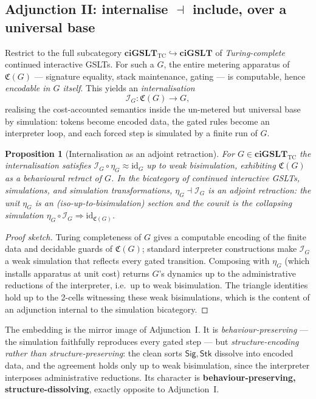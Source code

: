 \documentclass[11pt]{article}
\theoremstyle{definition}
\theoremstyle{plain}
\newtheorem{proposition}[definition]{Proposition}
\newcommand{\ciGSLT}{\mathbf{ciGSLT}}
\newcommand{\ciGSLTtc}{\mathbf{ciGSLT}_{\mathrm{TC}}}
\newcommand{\Imp}{\mathcal{I}}
\newcommand{\id}{\mathrm{id}}
\newcommand{\Sig}{\mathsf{Sig}}
\newcommand{\Tok}{\mathsf{Stk}}
\newcommand{\Cost}{\mathfrak{C}}              %
\begin{document}
\subsection{Adjunction II: internalise \texorpdfstring{$\dashv$}{-|} include, over a universal base}

Restrict to the full subcategory $\ciGSLTtc \hookrightarrow \ciGSLT$ of
\emph{Turing-complete} continued interactive GSLTs. For such a $G$, the
entire metering apparatus of $\Cost(G)$ --- signature equality, stack
maintenance, gating --- is computable, hence \emph{encodable in $G$
itself}. This yields an \emph{internalisation}
\[
  \Imp_G : \Cost(G) \longrightarrow G,
\]
realising the cost-accounted semantics inside the un-metered but
universal base by simulation: tokens become encoded data, the gated rules
become an interpreter loop, and each forced step is simulated by a finite
run of $G$.

\begin{proposition}[Internalisation as an adjoint retraction]
\label{prop:adj2}
For $G \in \ciGSLTtc$ the internalisation satisfies
$\Imp_G \circ \eta_G \approx \id_G$ up to weak bisimulation, exhibiting
$\Cost(G)$ as a behavioural retract of $G$. In the bicategory of
continued interactive GSLTs, simulations, and simulation transformations,
$\eta_G \dashv \Imp_G$ is an adjoint retraction: the unit
$\eta_G$ is an (iso-up-to-bisimulation) section and the counit is the
collapsing simulation $\eta_G \circ \Imp_G \Rightarrow \id_{\Cost(G)}$.
\end{proposition}

\begin{proof}[Proof sketch]
Turing completeness of $G$ gives a computable encoding of the finite data
and decidable guards of $\Cost(G)$; standard interpreter constructions
make $\Imp_G$ a weak simulation that reflects every gated transition.
Composing with $\eta_G$ (which installs apparatus at unit cost) returns
$G$'s dynamics up to the administrative reductions of the interpreter,
i.e.\ up to weak bisimulation. The triangle identities hold up to the
2-cells witnessing these weak bisimulations, which is the content of an
adjunction internal to the simulation bicategory.
\end{proof}

The embedding is the mirror image of Adjunction~I. It is
\emph{behaviour-preserving} --- the simulation faithfully reproduces every
gated step --- but \emph{structure-encoding rather than
structure-preserving}: the clean sorts $\Sig, \Tok$ dissolve into encoded
data, and the agreement holds only up to weak bisimulation, since the
interpreter interposes administrative reductions. Its character is
\textbf{behaviour-preserving, structure-dissolving}, exactly opposite to
Adjunction~I.
\end{document}
